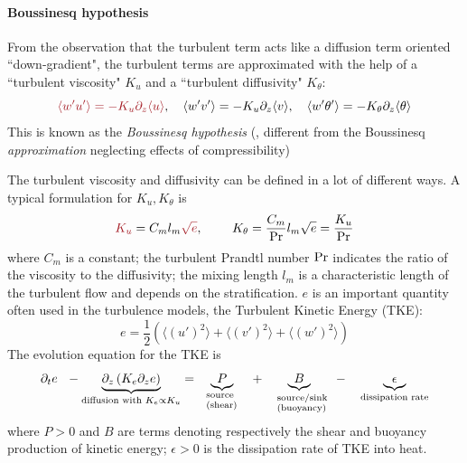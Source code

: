 \paragraph{Boussinesq hypothesis}
From the observation that the turbulent term acts like a diffusion
term oriented ``down-gradient", the turbulent terms are approximated
with the help of a ``turbulent viscosity" $K_u$ and a
``turbulent diffusivity" $K_\theta$:
\begin{equation}
\emphase{\langle w' u'\rangle =
	- K_u \partial_z \langle u \rangle}, ~~~
\langle w' v'\rangle = - K_u \partial_z \langle v \rangle, ~~~
\langle w' \theta'\rangle =
	- K_\theta \partial_z \langle \theta \rangle
\end{equation}
This is known as the \textit{Boussinesq hypothesis}
(\citep{boussinesq_theorie_1897},
different from the Boussinesq \textit{approximation} neglecting
effects of compressibility)
\par
The turbulent viscosity and diffusivity can be defined in a lot of
different ways. A typical formulation for $K_u, K_\theta$ is
\begin{equation}
	\emphase{K_u} = C_m l_m \emphase{\sqrt{e}}, ~~~~~~~ K_\theta = \frac{C_m}{\rm Pr}
	l_m \sqrt{e}
	= \frac{K_u}{\rm Pr}
\end{equation}
where $C_m$ is a constant; the turbulent Prandtl number
${\rm Pr}$ indicates the ratio of the viscosity to the diffusivity;
the mixing length $l_m$ is a characteristic
length of the turbulent flow and depends on the stratification.
$e$ is an important quantity often used in the turbulence models,
the Turbulent Kinetic Energy (TKE):
\begin{equation}
	e = \frac{1}{2} \left(\langle (u')^2 \rangle + \langle (v')^2 \rangle
	+ \langle (w')^2 \rangle\right)
\end{equation}
The evolution equation for the TKE is
\begin{equation}
	\partial_t e ~~-
\underbrace{\partial_z \left(K_e
    \partial_z e\right)}_{\text{diffusion with } K_e \propto K_u}
    =
	~~\underbrace{P}_{\parbox{25pt}{\scriptsize{ source\\(shear)}}}
	~~~+~~~
	\underbrace{B}_{\parbox{35pt}{\scriptsize{ source/sink\\(buoyancy)}}}
	~~~-~~~
	\underbrace{\epsilon}_{\text{dissipation rate}}
\end{equation}
where $P>0$ and $B$ are terms denoting respectively
the shear and buoyancy production of kinetic energy;
$\epsilon>0$ is the dissipation rate of TKE
into heat.
\par
